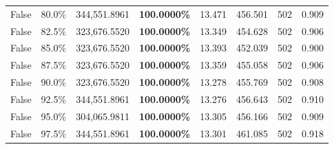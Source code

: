 \begin{table}[H]
\begin{tabular}{lllrllll}
\cline{1-8}
False & 80.0\% & 344,551.8961 & \bfseries \color{red} 100.0000\% & 13.471 & 456.501 & 502 & 0.909 \\
\cline{1-8}
False & 82.5\% & 323,676.5520 & \bfseries \color{red} 100.0000\% & 13.349 & 454.628 & 502 & 0.906 \\
\cline{1-8}
False & 85.0\% & 323,676.5520 & \bfseries \color{red} 100.0000\% & 13.393 & 452.039 & 502 & 0.900 \\
\cline{1-8}
False & 87.5\% & 323,676.5520 & \bfseries \color{red} 100.0000\% & 13.359 & 455.058 & 502 & 0.906 \\
\cline{1-8}
False & 90.0\% & 323,676.5520 & \bfseries \color{red} 100.0000\% & 13.278 & 455.769 & 502 & 0.908 \\
\cline{1-8}
False & 92.5\% & 344,551.8961 & \bfseries \color{red} 100.0000\% & 13.276 & 456.643 & 502 & 0.910 \\
\cline{1-8}
False & 95.0\% & 304,065.9811 & \bfseries \color{red} 100.0000\% & 13.305 & 456.166 & 502 & 0.909 \\
\cline{1-8}
False & 97.5\% & 344,551.8961 & \bfseries \color{red} 100.0000\% & 13.301 & 461.085 & 502 & 0.918 \\
\cline{1-8}
\bottomrule
\end{tabular}
\end{table}
